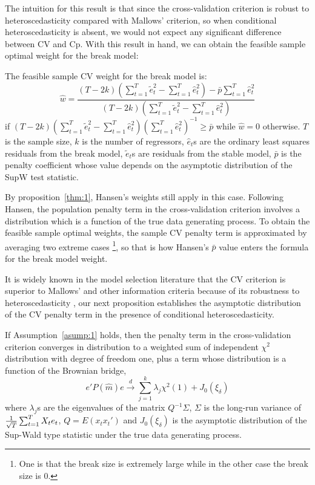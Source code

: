 The intuition for this result is that since the cross-validation criterion is robust to heteroscedasticity compared with Mallows' criterion, so when conditional heteroscedasticity is absent, we would not expect any significant difference between CV and Cp. With this result in hand, we can obtain the feasible sample optimal weight for the break model:

\begin{corollary} \label{corollary:1}
The feasible sample CV weight for the break model is:
    \begin{equation}
    \hat{w} = \frac{(T - 2k)(\sum_{t=1}^{T}\tilde{e}_{t}^{2} - \sum_{t=1}^{T}\hat{e}_{t}^{2}) - \bar{p}\sum_{t=1}^{T}\hat{e}_{t}^{2}}{(T - 2k)(\sum_{t=1}^{T}\tilde{e}_{t}^{2} - \sum_{t=1}^{T}\hat{e}_{t}^{2})}
    \end{equation}
if $(T - 2k)(\sum_{t=1}^{T}\tilde{e}_{t}^{2} - \sum_{t=1}^{T}\hat{e}_{t}^{2})(\sum_{t=1}^{T}\hat{e}_{t}^{2})^{-1} \geq \bar{p}$ while $\hat{w} = 0$ otherwise. $T$ is the sample size, $k$ is the number of regressors, $\hat{e}_t$s are the ordinary least squares residuals from the break model, $\tilde{e}_t$s are residuals from the stable model, $\bar{p}$ is the penalty coefficient whose value depends on the asymptotic distribution of the SupW test statistic.
\end{corollary}

By proposition~\ref{thm:1}, Hansen's weights \cite{hansen2009averaging} still apply in this case. Following Hansen, the population penalty term in the cross-validation criterion involves a distribution which is a function of the true data generating process. To obtain the feasible sample optimal weights, the sample CV penalty term is approximated by averaging two extreme cases \footnote{One is that the break size is extremely large while in the other case the break size is $0$.}, so that is how Hansen's $\bar{p}$ value enters the formula for the break model weight.

It is widely known in the model selection literature that the CV criterion is superior to Mallows' and other information criteria because of its robustness to heteroscedasticity \cite{andrews_JE1991}, our next proposition establishes the asymptotic distribution of the CV penalty term in the presence of conditional heteroscedasticity.
\begin{proposition} \label{thm:2}
If Assumption~\ref{asump:1} holds, then the penalty term in the cross-validation criterion converges in distribution to a weighted sum of independent $\chi^2$ distribution with degree of freedom one, plus a term whose distribution is a function of the Brownian bridge,
    \begin{equation} \label{eq:4}
    	e'P(\hat{m})e \stackrel{d}{\rightarrow} \sum_{j=1}^{k} \lambda_j \chi^2(1) + J_0(\xi_{\delta})
    \end{equation}
where $\lambda_j$s are the eigenvalues of the matrix $Q^{-1}\Sigma$, $\Sigma$ is the long-run variance of $\frac{1}{\sqrt{T}}\sum_{t=1}^{T} X_t e_t$, $Q = E(x_t x_t')$ and $J_0(\xi_{\delta})$ is the asymptotic distribution of the Sup-Wald type statistic under the true data generating process.
\end{proposition}

